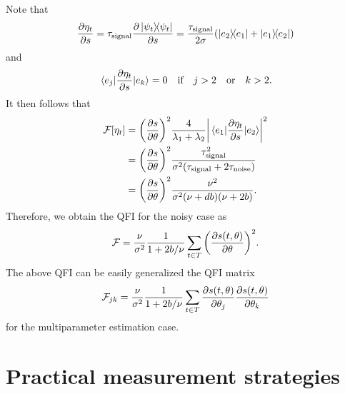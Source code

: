 \documentclass[aps,pra,10pt,showpacs,amsmath,amssymb,floatfix,superscriptaddress,twocolumn]{revtex4-2}
\begin{document}
Note that
\begin{equation}
    \pdv{\eta_t}{s} = \tau_\mathrm{signal} \pdv{\op{\psi_t}}{s}
    = \frac{\tau_\mathrm{signal}}{2\sigma} (\op{e_2}{e_1} + \op{e_1}{e_2})
\end{equation}
and
\begin{equation}
    \mel{e_j}{\pdv{\eta_t}{s}}{e_k} = 0 \qif j > 2 \qor k > 2.
\end{equation}
It then follows that
\begin{align}
    \mathcal F[\eta_t] &=  \qty(\pdv{s}{\theta})^2 \frac{4}{\lambda_1 + \lambda_2} \qty|\mel{e_1}{\pdv{\eta_t}{s}}{e_2}|^2 \\
    &=\qty(\pdv{s}{\theta})^2 \frac{\tau_\mathrm{signal}^2}{\sigma^2(\tau_\mathrm{signal} + 2 \tau_\mathrm{noise})}\\
    &=\qty(\pdv{s}{\theta})^2 \frac{\nu^2}{\sigma^2(\nu + db)(\nu+2b)}.
\end{align}
Therefore, we obtain the QFI for the noisy case as
\begin{equation}
    \mathcal F = \frac{\nu}{\sigma^2} \frac{1}{1+2b/\nu} \sum_{t\in T} \qty(\pdv{s(t,\theta)}{\theta})^2.
\end{equation}
The above QFI can be easily generalized the QFI matrix
\begin{equation}\label{seq:QFIM_noisy}
    \mathcal F_{jk} = \frac{\nu}{\sigma^2} \frac{1}{1+2b/\nu} \sum_{t\in T}
    \pdv{s(t,\theta)}{\theta_j} \pdv{s(t,\theta)}{\theta_k}
\end{equation}
for the multiparameter estimation case.


\section{Practical measurement strategies}
\end{document}
